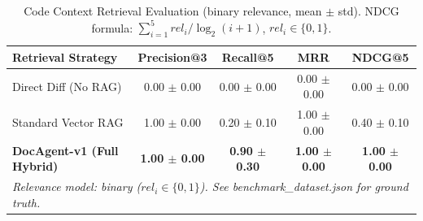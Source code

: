 \begin{table}[ht]
\centering
\caption{Code Context Retrieval Evaluation (binary relevance, mean $\pm$ std). NDCG formula: $\sum_{i=1}^{5} rel_i / \log_2(i+1)$, $rel_i \in \{0,1\}$.}
\label{tab:retrieval_eval}
\begin{tabular}{lcccc}
\hline
\textbf{Retrieval Strategy} & \textbf{Precision@3} & \textbf{Recall@5} & \textbf{MRR} & \textbf{NDCG@5} \\
\hline
Direct Diff (No RAG) & 0.00 $\pm$ 0.00 & 0.00 $\pm$ 0.00 & 0.00 $\pm$ 0.00 & 0.00 $\pm$ 0.00 \\
Standard Vector RAG & 1.00 $\pm$ 0.00 & 0.20 $\pm$ 0.10 & 1.00 $\pm$ 0.00 & 0.40 $\pm$ 0.10 \\
\textbf{DocAgent-v1 (Full Hybrid)} & \textbf{1.00 $\pm$ 0.00} & \textbf{0.90 $\pm$ 0.30} & \textbf{1.00 $\pm$ 0.00} & \textbf{1.00 $\pm$ 0.00} \\
\hline
\multicolumn{5}{l}{\textit{Relevance model: binary ($rel_i \in \{0,1\}$). See benchmark\_dataset.json for ground truth.}} \\
\end{tabular}
\end{table}